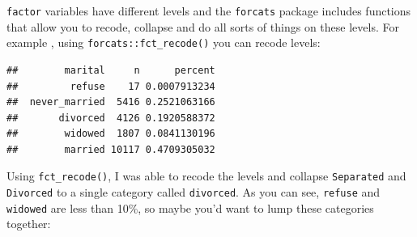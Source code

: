 \documentclass[]{gitbook}
\newenvironment{Shaded}{\begin{snugshade}}{\end{snugshade}}
\newcommand{\DataTypeTok}[1]{\textcolor[rgb]{0.13,0.29,0.53}{#1}}
\newcommand{\FloatTok}[1]{\textcolor[rgb]{0.00,0.00,0.81}{#1}}
\newcommand{\KeywordTok}[1]{\textcolor[rgb]{0.13,0.29,0.53}{\textbf{#1}}}
\newcommand{\NormalTok}[1]{#1}
\newcommand{\OperatorTok}[1]{\textcolor[rgb]{0.81,0.36,0.00}{\textbf{#1}}}
\newcommand{\StringTok}[1]{\textcolor[rgb]{0.31,0.60,0.02}{#1}}
\theoremstyle{definition}
\theoremstyle{definition}
\theoremstyle{definition}
\theoremstyle{remark}
\begin{document}
\texttt{factor} variables have different levels and the \texttt{forcats}
package includes functions that allow you to recode, collapse and do all
sorts of things on these levels. For example , using
\texttt{forcats::fct\_recode()} you can recode levels:

\begin{Shaded}
\end{Shaded}

\begin{verbatim}
##        marital     n      percent
##         refuse    17 0.0007913234
##  never_married  5416 0.2521063166
##       divorced  4126 0.1920588372
##        widowed  1807 0.0841130196
##        married 10117 0.4709305032
\end{verbatim}

Using \texttt{fct\_recode()}, I was able to recode the levels and
collapse \texttt{Separated} and \texttt{Divorced} to a single category
called \texttt{divorced}. As you can see, \texttt{refuse} and
\texttt{widowed} are less than 10\%, so maybe you'd want to lump these
categories together:

\begin{Shaded}
\end{Shaded}
\end{document}
